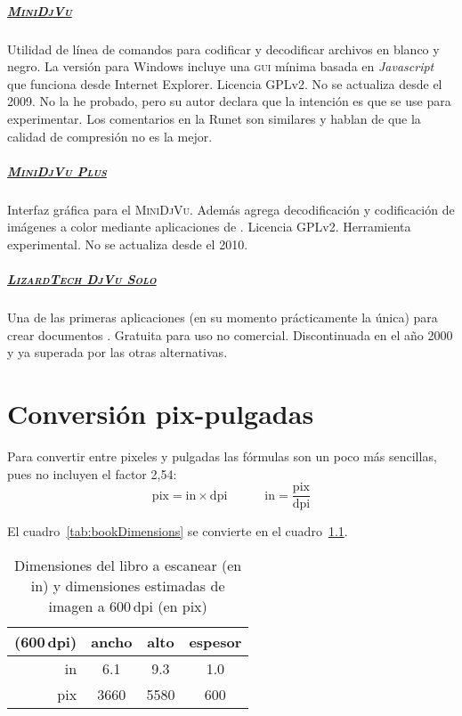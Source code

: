 \documentclass[%
	a5paper,
	10pt,
	twoside,
	openright,
	final,
]{memoir}
\begin{document}
	\paragraph{\href{http://minidjvu.sourceforge.net/}{\textsc{MiniDjVu}}} Utilidad de línea de comandos para codificar y decodificar archivos \djvu en blanco y negro. La versión para Windows incluye una \textsc{gui} mínima basada en \emph{Javascript} que funciona desde Internet Explorer. Licencia GPLv2. No se actualiza desde el 2009. No la he probado, pero su autor declara que la intención es que se use para experimentar. Los comentarios en la Runet \cite{WikipediaRunet} son similares y hablan de que la calidad de compresión no es la mejor.
	\paragraph{\href{http://www.djvu-scan.ru/forum/index.php?topic=52.0}{\textsc{MiniDjVu Plus}}} Interfaz gráfica para el \textsc{MiniDjVu}. Además agrega decodificación y codificación de imágenes a color mediante aplicaciones de \djvulibre. Licencia GPLv2. Herramienta experimental. No se actualiza desde el 2010.
	\paragraph{\href{http://www.djvu.org/resources/}{\textsc{LizardTech DjVu Solo}}} Una de las primeras aplicaciones (en su momento prácticamente la única) para crear documentos \djvu. Gratuita para uso no comercial. Discontinuada en el año 2000 y ya superada por las otras alternativas.

	\chapter{Conversión pix-pulgadas\label{app:conversion}} Para convertir entre pixeles y pulgadas las fórmulas son un poco más sencillas, pues no incluyen el factor \mbox{2,54}:
	\[
		\text{pix} = \text{in} \times \text{dpi}\hspace{3em} \text{in} = \frac{\text{pix}}{\text{dpi}}
	\]

	El cuadro~\ref{tab:bookDimensions} se convierte en el cuadro~\ref{tab:bookDimensionsInches}.
	\begin{table}
		\centering
		\begin{tabular}{rccc}
			\toprule
			(600\,dpi) & ancho & alto & espesor \\
			\midrule
			in  & 6.1 & 9.3 & 1.0 \\
			pix & 3660 & 5580 & 600 \\
			\bottomrule
		\end{tabular}
		\caption{Dimensiones del libro a escanear (en in) y dimensiones estimadas de imagen a 600\,dpi (en pix)\label{tab:bookDimensionsInches}}
	\end{table}
\end{document}
